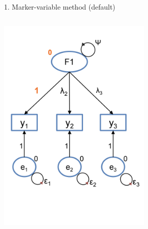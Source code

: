 \documentclass[10pt]{beamer}\usepackage[]{graphicx}\usepackage[]{xcolor}
\begin{document}
\begin{frame}{1. Marker-variable method (default)}
\begin{columns}[T]
\begin{column}{.34\textwidth}
            \includegraphics[width=\linewidth,height=\textheight,keepaspectratio]{images/slide56.png}     
     
    \end{column}%

    \end{columns}

\end{frame}
%
\end{document}
